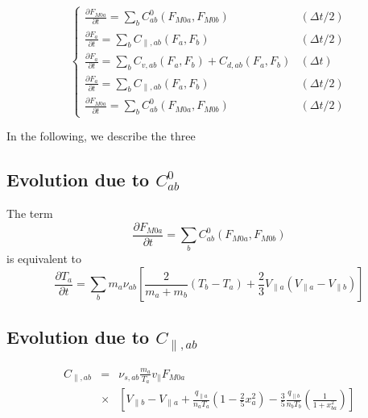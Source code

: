 \documentclass[11pt,preprint]{elsarticle}
\begin{document}
\begin{equation}
\begin{cases}
\frac{\partial F_{M0a}}{\partial t}=\sum_{b}C_{ab}^{0}\left(F_{M0a},F_{M0b}\right) & (\Delta t / 2)\\
\frac{\partial F_{a}}{\partial t}=\sum_{b}C_{\parallel,ab}\left(F_{a},F_{b}\right) & (\Delta t / 2)\\
\frac{\partial F_{a}}{\partial t}=\sum_{b}C_{v,ab}\left(F_{a},F_{b}\right)+C_{d,ab}\left(F_{a},F_{b}\right) & (\Delta t) \\
\frac{\partial F_{a}}{\partial t}=\sum_{b}C_{\parallel,ab}\left(F_{a},F_{b}\right) & (\Delta t / 2)\\
\frac{\partial F_{M0a}}{\partial t}=\sum_{b}C_{ab}^{0}\left(F_{M0a},F_{M0b}\right) & (\Delta t / 2)
\end{cases}\label{eq:system of equation to solve}
\end{equation}

In the following, we describe the three

\subsection{Evolution due to $C_{ab}^{0}$ }

The term 
\begin{equation*}
    \frac{\partial F_{M0a}}{\partial t}=\sum_{b}C_{ab}^{0}\left(F_{M0a},F_{M0b}\right)
\end{equation*}
is equivalent to
\begin{equation}
\frac{\partial T_{a}}{\partial t}=\sum_{b}m_{a}\nu_{ab}\left[\frac{2}{m_{a}+m_{b}}\left(T_{b}-T_{a}\right)+\frac{2}{3}V_{\parallel a}\left(V_{\parallel a}-V_{\parallel b}\right)\right]\label{eq:evolution_Maxwellian}
\end{equation}

\subsection{Evolution due to $C_{\parallel,ab}$ }



\begin{eqnarray}
C_{\parallel,ab} & = & \nu_{s,ab}\frac{m_{a}}{T_{a}}v_{\parallel}F_{M0a}\\
 & \times & \left[V_{\parallel b}-V_{\parallel a}+\frac{q_{\parallel a}}{n_{a}T_{a}}\left(1-\frac{2}{5}x_{a}^{2}\right)-\frac{3}{5}\frac{q_{\parallel b}}{n_{b}T_{b}}\left(\frac{1}{1+x_{ba}^{2}}\right)\right] \nonumber
\end{eqnarray}
\end{document}
